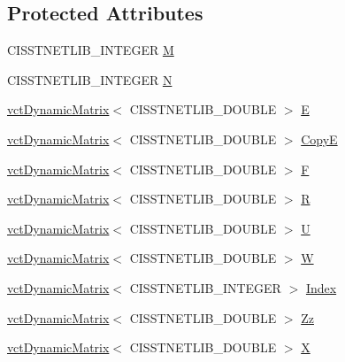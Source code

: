 \subsection*{Protected Attributes}
\begin{DoxyCompactItemize}
\item 
C\+I\+S\+S\+T\+N\+E\+T\+L\+I\+B\+\_\+\+I\+N\+T\+E\+G\+E\+R \hyperlink{classnmr_l_d_p_solver_af5eac8148f7f7cc21c6a91f525875c47}{M}
\item 
C\+I\+S\+S\+T\+N\+E\+T\+L\+I\+B\+\_\+\+I\+N\+T\+E\+G\+E\+R \hyperlink{classnmr_l_d_p_solver_abda6658672502493b5b4b28c0213d473}{N}
\item 
\hyperlink{classvct_dynamic_matrix}{vct\+Dynamic\+Matrix}$<$ C\+I\+S\+S\+T\+N\+E\+T\+L\+I\+B\+\_\+\+D\+O\+U\+B\+L\+E $>$ \hyperlink{classnmr_l_d_p_solver_a344c1e26e6c33572041e1260a3fe9365}{E}
\item 
\hyperlink{classvct_dynamic_matrix}{vct\+Dynamic\+Matrix}$<$ C\+I\+S\+S\+T\+N\+E\+T\+L\+I\+B\+\_\+\+D\+O\+U\+B\+L\+E $>$ \hyperlink{classnmr_l_d_p_solver_a421efd168683e0116dafff04eec37200}{Copy\+E}
\item 
\hyperlink{classvct_dynamic_matrix}{vct\+Dynamic\+Matrix}$<$ C\+I\+S\+S\+T\+N\+E\+T\+L\+I\+B\+\_\+\+D\+O\+U\+B\+L\+E $>$ \hyperlink{classnmr_l_d_p_solver_a0b71d56e0b8a6bbf2f1111d07cf59d36}{F}
\item 
\hyperlink{classvct_dynamic_matrix}{vct\+Dynamic\+Matrix}$<$ C\+I\+S\+S\+T\+N\+E\+T\+L\+I\+B\+\_\+\+D\+O\+U\+B\+L\+E $>$ \hyperlink{classnmr_l_d_p_solver_ae136de32bb183f7a4d33f5ac0a900130}{R}
\item 
\hyperlink{classvct_dynamic_matrix}{vct\+Dynamic\+Matrix}$<$ C\+I\+S\+S\+T\+N\+E\+T\+L\+I\+B\+\_\+\+D\+O\+U\+B\+L\+E $>$ \hyperlink{classnmr_l_d_p_solver_aced79c3137adca24863b074458cfe623}{U}
\item 
\hyperlink{classvct_dynamic_matrix}{vct\+Dynamic\+Matrix}$<$ C\+I\+S\+S\+T\+N\+E\+T\+L\+I\+B\+\_\+\+D\+O\+U\+B\+L\+E $>$ \hyperlink{classnmr_l_d_p_solver_a737657d4b69aef9cf571f9bdcf818d9c}{W}
\item 
\hyperlink{classvct_dynamic_matrix}{vct\+Dynamic\+Matrix}$<$ C\+I\+S\+S\+T\+N\+E\+T\+L\+I\+B\+\_\+\+I\+N\+T\+E\+G\+E\+R $>$ \hyperlink{classnmr_l_d_p_solver_a5dcd4ece4fd96ef31855281ea0555762}{Index}
\item 
\hyperlink{classvct_dynamic_matrix}{vct\+Dynamic\+Matrix}$<$ C\+I\+S\+S\+T\+N\+E\+T\+L\+I\+B\+\_\+\+D\+O\+U\+B\+L\+E $>$ \hyperlink{classnmr_l_d_p_solver_ab8b43ef98ca002bfc8d3b6ad4e6ac654}{Zz}
\item 
\hyperlink{classvct_dynamic_matrix}{vct\+Dynamic\+Matrix}$<$ C\+I\+S\+S\+T\+N\+E\+T\+L\+I\+B\+\_\+\+D\+O\+U\+B\+L\+E $>$ \hyperlink{classnmr_l_d_p_solver_a5868c434e5fef304f43ea90e8202d897}{X}
\end{DoxyCompactItemize}


